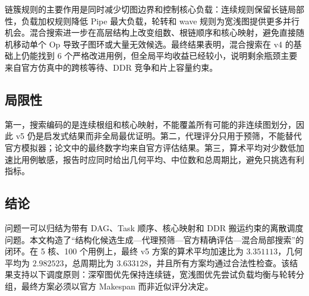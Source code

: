 链簇规则的主要作用是同时减少切图边界和控制核心负载：连续规则保留长链局部性，负载加权规则降低 Pipe 最大负载，轮转和 wave 规则为宽浅图提供更多并行机会。混合搜索进一步在高层结构上改变组数、根链顺序和核心映射，避免直接随机移动单个 Op 导致子图环或大量无效候选。最终结果表明，混合搜索在 v4 的基础上仍能找到 6 个严格改进用例，但全局平均收益已经较小，说明剩余瓶颈主要来自官方仿真中的跨核等待、DDR 竞争和片上容量约束。

\subsection{局限性}

第一，搜索编码的是连续根组和核心映射，不能覆盖所有可能的非连续图划分，因此 v5 仍是启发式结果而非全局最优证明。第二，代理评分只用于预筛，不能替代官方模拟器；论文中的最终数字均来自官方评估结果。第三，算术平均对少数低加速比用例敏感，报告时应同时给出几何平均、中位数和总周期比，避免只挑选有利指标。

\subsection{结论}

问题一可以归结为带有 DAG、Task 顺序、核心映射和 DDR 搬运约束的离散调度问题。本文构造了“结构化候选生成—代理预筛—官方精确评估—混合局部搜索”的闭环。在 5 核、100 个用例上，最终 v5 方案的算术平均加速比为 $3.351113$，几何平均为 $2.982523$，总周期比为 $3.633128$，并且所有方案均通过合法性检查。该结果支持以下调度原则：深窄图优先保持连续链，宽浅图优先尝试负载均衡与轮转分组，最终方案必须以官方 Makespan 而非近似评分决定。
